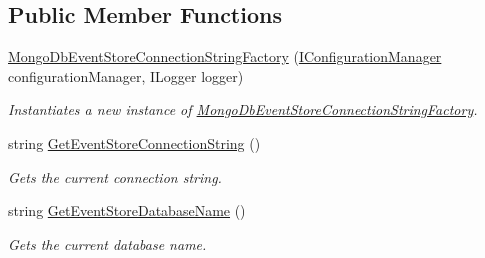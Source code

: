 \subsection*{Public Member Functions}
\begin{DoxyCompactItemize}
\item 
\hyperlink{classCqrs_1_1MongoDB_1_1Events_1_1MongoDbEventStoreConnectionStringFactory_afb24fa31922f1297f7d7d80c7b14ee14_afb24fa31922f1297f7d7d80c7b14ee14}{Mongo\+Db\+Event\+Store\+Connection\+String\+Factory} (\hyperlink{interfaceCqrs_1_1Configuration_1_1IConfigurationManager}{I\+Configuration\+Manager} configuration\+Manager, I\+Logger logger)
\begin{DoxyCompactList}\small\item\em Instantiates a new instance of \hyperlink{classCqrs_1_1MongoDB_1_1Events_1_1MongoDbEventStoreConnectionStringFactory}{Mongo\+Db\+Event\+Store\+Connection\+String\+Factory}. \end{DoxyCompactList}\item 
string \hyperlink{classCqrs_1_1MongoDB_1_1Events_1_1MongoDbEventStoreConnectionStringFactory_af78f60c035678185ecd266019f42838b_af78f60c035678185ecd266019f42838b}{Get\+Event\+Store\+Connection\+String} ()
\begin{DoxyCompactList}\small\item\em Gets the current connection string. \end{DoxyCompactList}\item 
string \hyperlink{classCqrs_1_1MongoDB_1_1Events_1_1MongoDbEventStoreConnectionStringFactory_a282bda17095c8ea293f5305ea0d1b83c_a282bda17095c8ea293f5305ea0d1b83c}{Get\+Event\+Store\+Database\+Name} ()
\begin{DoxyCompactList}\small\item\em Gets the current database name. \end{DoxyCompactList}\end{DoxyCompactItemize}
